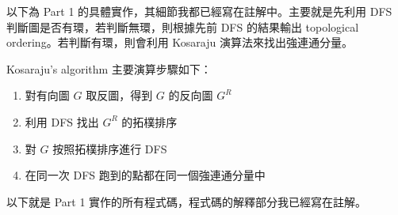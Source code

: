 \documentclass{article}[12pt]
\begin{document}
以下為 Part 1 的具體實作，其細節我都已經寫在註解中。主要就是先利用 DFS 判斷圖是否有環，若判斷無環，則根據先前 DFS 的結果輸出 topological ordering。若判斷有環，則會利用 Kosaraju 演算法來找出強連通分量。

Kosaraju's algorithm 主要演算步驟如下：
\begin{enumerate}
\item 對有向圖 $G$ 取反圖，得到 $G$ 的反向圖 $G^{R}$
\item 利用 DFS 找出 $G^R$ 的拓樸排序
\item 對 $G$ 按照拓樸排序進行 DFS
\item 在同一次 DFS 跑到的點都在同一個強連通分量中
\end{enumerate}

以下就是 Part 1 實作的所有程式碼，程式碼的解釋部分我已經寫在註解。
\end{document}
